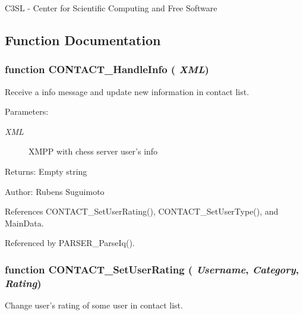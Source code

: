 C3SL - Center for Scientific Computing and Free Software 

\subsection{Function Documentation}
\subsubsection[CONTACT\_\-HandleInfo]{\setlength{\rightskip}{0pt plus 5cm}function CONTACT\_\-HandleInfo ( {\em XML})}\label{info_8js_40fd163b2a7192238e6339e6c353afce}


Receive a info message and update new information in contact list. 

\begin{Desc}
\item[Parameters:]
\begin{description}
\item[{\em XML}]XMPP with chess server user's info \end{description}
\end{Desc}
\begin{Desc}
\item[Returns:]Empty string \end{Desc}
\begin{Desc}
\item[Author:]Rubens Suguimoto \end{Desc}


References CONTACT\_\-SetUserRating(), CONTACT\_\-SetUserType(), and MainData.

Referenced by PARSER\_\-ParseIq().
\subsubsection[CONTACT\_\-SetUserRating]{\setlength{\rightskip}{0pt plus 5cm}function CONTACT\_\-SetUserRating ( {\em Username}, \/   {\em Category}, \/   {\em Rating})}\label{info_8js_cfe04b0f835f6bf6c8e46a7bc6f7f688}


Change user's rating of some user in contact list. 

